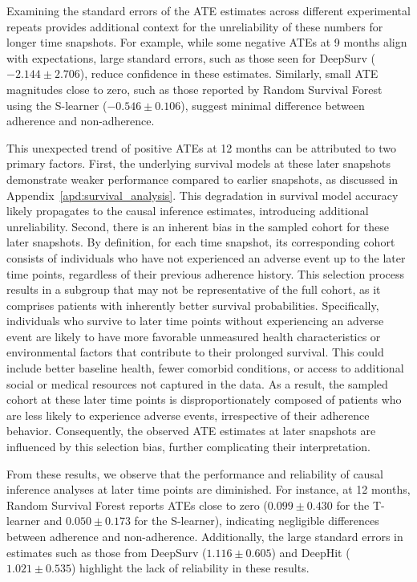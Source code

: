 Examining the standard errors of the ATE estimates across different experimental repeats provides additional context for the unreliability of these numbers for longer time snapshots.
For example, while some negative ATEs at 9 months align with expectations, large standard errors, such as those seen for DeepSurv (\(-2.144 \pm 2.706\)), reduce confidence in these estimates.
Similarly, small ATE magnitudes close to zero, such as those reported by Random Survival Forest using the S-learner (\(-0.546 \pm 0.106\)), suggest minimal difference between adherence and non-adherence.

This unexpected trend of positive ATEs at 12 months can be attributed to two primary factors.
First, the underlying survival models at these later snapshots demonstrate weaker performance compared to earlier snapshots, as discussed in Appendix~\ref{apd:survival_analysis}.
This degradation in survival model accuracy likely propagates to the causal inference estimates, introducing additional unreliability.
Second, there is an inherent bias in the sampled cohort for these later snapshots.
By definition, for each time snapshot, its corresponding cohort consists of individuals who have not experienced an adverse event up to the later time points, regardless of their previous adherence history.
This selection process results in a subgroup that may not be representative of the full cohort, as it comprises patients with inherently better survival probabilities.
Specifically, individuals who survive to later time points without experiencing an adverse event are likely to have more favorable unmeasured health characteristics or environmental factors that contribute to their prolonged survival.
This could include better baseline health, fewer comorbid conditions, or access to additional social or medical resources not captured in the data.
As a result, the sampled cohort at these later time points is disproportionately composed of patients who are less likely to experience adverse events, irrespective of their adherence behavior.
Consequently, the observed ATE estimates at later snapshots are influenced by this selection bias, further complicating their interpretation.

From these results, we observe that the performance and reliability of causal inference analyses at later time points are diminished.
For instance, at 12 months, Random Survival Forest reports ATEs close to zero (\(0.099 \pm 0.430\) for the T-learner and \(0.050 \pm 0.173\) for the S-learner), indicating negligible differences between adherence and non-adherence.
Additionally, the large standard errors in estimates such as those from DeepSurv (\(1.116 \pm 0.605\)) and DeepHit (\(1.021 \pm 0.535\)) highlight the lack of reliability in these results.

